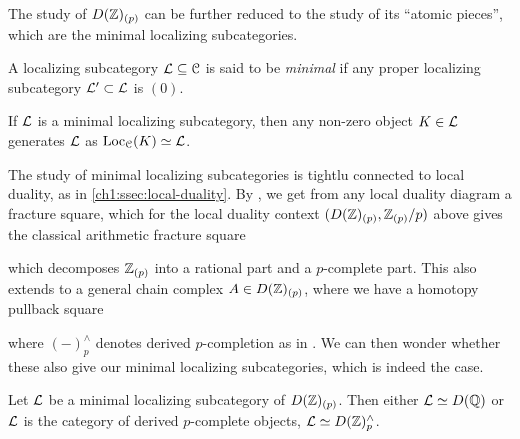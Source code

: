 The study of $D(\mathbb{Z})_{(p)}$ can be further reduced to the study of its ``atomic pieces'', which are the minimal localizing subcategories. 

\begin{definition}
    \label{ch1:def:minimal-localizing-subcategory}
    A localizing subcategory $\mathcal{L}\subseteq \EuScript{C}$ is said to be \emph{minimal} if any proper localizing subcategory $\mathcal{L}'\subset \mathcal{L}$ is $(0)$.  
\end{definition}

\begin{remark}
    If $\mathcal{L}$ is a minimal localizing subcategory, then any non-zero object $K\in \mathcal{L}$ generates $\mathcal{L}$ as $\operatorname{Loc}_{\EuScript{C}}(K)\simeq \mathcal{L}$.
\end{remark}

The study of minimal localizing subcategories is tightlu connected to local duality, as in \cref{ch1:ssec:local-duality}. By \cite[2.26]{barthel-heard-valenzuela_2018}, we get from any local duality diagram a fracture square, which for the local duality context $(D(\mathbb{Z})_{(p)}, \mathbb{Z}_{(p)}/p)$ above gives the classical arithmetic fracture square
\begin{center}
\end{center}
which decomposes $\mathbb{Z}_{(p)}$ into a rational part and a $p$-complete part. This also extends to a general chain complex $A\in D(\mathbb{Z})_{(p)}$, where we have a homotopy pullback square 
\begin{center}
\end{center}
where $(-)_p^\wedge$ denotes derived $p$-completion as in \crefme. We can then wonder whether these also give our minimal localizing subcategories, which is indeed the case. 

\begin{proposition}
    Let $\mathcal{L}$ be a minimal localizing subcategory of $D(\mathbb{Z})_{(p)}$. Then either $\mathcal{L} \simeq D(\mathbb{Q})$ or $\mathcal{L}$ is the category of derived $p$-complete objects, $\mathcal{L}\simeq D(\mathbb{Z})^\wedge_p$.
\end{proposition}

